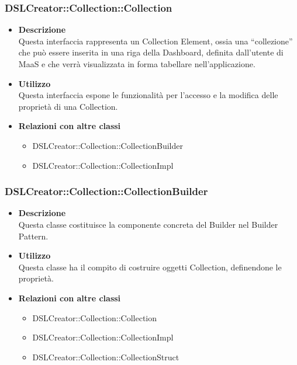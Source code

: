  \subsubsection{DSLCreator::Collection::Collection}
                    \begin{itemize}
                        \item \textbf{Descrizione} \hfill \\
                            Questa interfaccia rappresenta un Collection Element, ossia una ``collezione'' che può essere inserita in una riga della Dashboard, definita dall'utente di MaaS e che verrà visualizzata in forma tabellare nell'applicazione.
                        \item \textbf{Utilizzo} \hfill \\
                            Questa interfaccia espone le funzionalità per l'accesso e la modifica delle proprietà di una Collection.
                        \item \textbf{Relazioni con altre classi}
                            \begin{itemize}
                              \item DSLCreator::Collection::CollectionBuilder
                              \item DSLCreator::Collection::CollectionImpl
                            \end{itemize}
                    \end{itemize}

 \subsubsection{DSLCreator::Collection::CollectionBuilder}
                    \begin{itemize}
                        \item \textbf{Descrizione} \hfill \\
                            Questa classe costituisce la componente concreta del Builder nel Builder Pattern.
                        \item \textbf{Utilizzo} \hfill \\
                            Questa classe ha il compito di costruire oggetti Collection, definendone le proprietà.
                        \item \textbf{Relazioni con altre classi}
                            \begin{itemize}
                              \item DSLCreator::Collection::Collection
                              \item DSLCreator::Collection::CollectionImpl
                              \item DSLCreator::Collection::CollectionStruct
                            \end{itemize}
                    \end{itemize}

